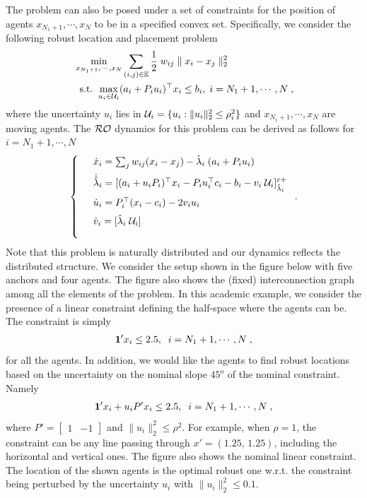 \documentclass[journal,twoside,web]{ieeecolor}
\newcommand{\rev}[1]{#1}
\begin{document}
\rev{The problem can also be posed under} a set of constraints for the position of agents $\rev{x_{N_1+1},\cdots,x_{N}}$ to be in a specified convex set. Specifically, we consider the following robust location and placement problem
\begin{align*}
    &\min_{x_{N_1+1},\cdots,x_N} \sum_{(i,j)\in {\mathbb E}} \frac{1}{2}\; w_{ij} \parallel x_i - x_j \parallel_2^2\\
    &\;\;\text{s.t.}\;\;\underset{u_i\in {\cal U}_i}{\max} (a_i+P_i u_i)^\top x_i \leq b_i, \; i={N_1+1},\cdots,N\;,
\end{align*}
where the uncertainty $u_i$ lies in $\rev{{\cal U}_i = \{ u_i : \| u_i \|_2^2 \leq \rho_i^2 \}}$ and $\rev{x_{N_1+1}},\cdots,x_{N}$ are moving agents. The ${\cal RO}$ dynamics for this problem can be derived as follows for $i=N_1+1,\cdots,N$
\begin{align*}
\left\{
\begin{array}{cl}
\vspace{2mm}
&\dot{x}_i=\sum_j w_{ij} (x_i-x_j)-\hat \lambda_i \; (a_i+P_i u_i)\\
\vspace{2mm}
&\dot{\hat \lambda}_i=[(a_i+u_i P_i)^\top x_i-P_i u_i^\top c_i-b_i-v_i\; \mathcal{U}_i]_{\hat \lambda_i}^{\varepsilon+}\\
\vspace{2mm}
&\dot{u}_i=P_i^\top (x_i-c_i)-2v_i u_i\\
\vspace{2mm}
&\dot{v}_i=[\hat \lambda_i\; \mathcal{U}_i]
\vspace{2mm}
\end{array}\right..
\end{align*}
Note that this problem is naturally distributed and our dynamics reflects the distributed structure. We consider the setup shown in the figure below with five anchors and four agents. The figure also shows the (fixed) interconnection graph among all the elements of the problem. In this academic example, we consider the presence of a linear constraint defining the half-space where the agents can be. The constraint is simply
\begin{align*}
{\bf 1}'x_i\leq 2.5, \;\; i=N_1+1,\cdots,N\;,
\end{align*}
for all the agents.
In addition, we would like the agents to find robust locations based on the uncertainty on the nominal slope $45^o$ of the nominal constraint. Namely
\begin{align*}
{\bf 1}'x_i+u_iP'x_i\leq 2.5,\;\; i=N_1+1,\cdots,N\;,
\end{align*}
where $P'=\begin{bmatrix}1&-1\end{bmatrix}$ and $\|u_i\|_2^2\leq \rho^2$. For example, when $\rho=1$, the constraint can be any line passing through $x'=(1.25,\,1.25)$, including the horizontal and vertical ones. The figure also shows the nominal linear constraint. The location of the shown agents is the optimal robust one w.r.t. the constraint being perturbed by the uncertainty $u_i$ with $\|u_i\|_2^2\leq 0.1$.
\end{document}
